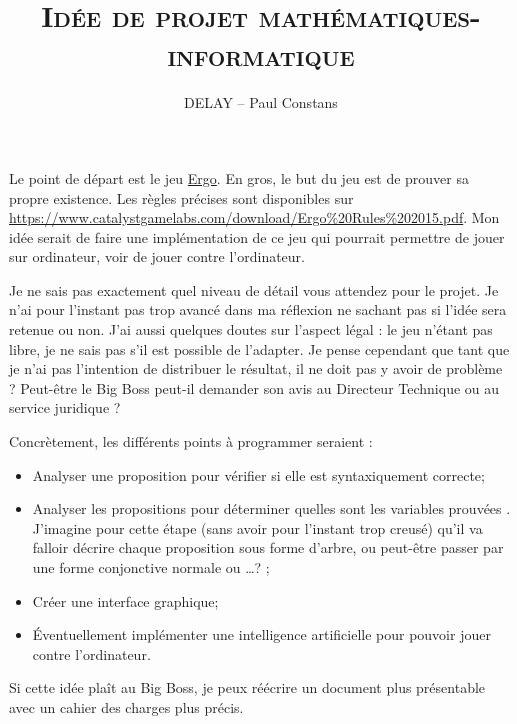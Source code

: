 \documentclass[12pt]{cours}
\title{\textbf{\textsc{Idée de projet mathématiques-informatique}}}
\author{DELAY -- Paul Constans}
\begin{document}
Le point de départ est le jeu \href{https://www.catalystgamelabs.com/ergo/}{Ergo}. En gros, le but du jeu est de prouver sa propre existence. Les règles précises sont disponibles sur \url{https://www.catalystgamelabs.com/download/Ergo%20Rules%202015.pdf}. Mon idée serait de faire une implémentation de ce jeu qui pourrait permettre de jouer sur ordinateur, voir de jouer contre l'ordinateur.

Je ne sais pas exactement quel niveau de détail vous attendez pour le projet. Je n'ai pour l'instant pas trop avancé dans ma réflexion ne sachant pas si l'idée sera retenue ou non. J'ai aussi quelques doutes sur l'aspect légal : le jeu n'étant pas libre, je ne sais pas s'il est possible de l'adapter. Je pense cependant que tant que je n'ai pas l'intention de distribuer le résultat, il ne doit pas y avoir de problème ? Peut-être le Big Boss peut-il demander son avis au Directeur Technique ou au service juridique ?

Concrètement, les différents points à programmer seraient :
\begin{itemize}
\item Analyser une proposition pour vérifier si elle est syntaxiquement correcte;
\item Analyser les propositions pour déterminer quelles sont les variables \og prouvées \fg. J'imagine pour cette étape (sans avoir pour l'instant trop creusé) qu'il va falloir décrire chaque proposition sous forme d'arbre, ou peut-être passer par une forme conjonctive normale ou \dots ? ;
\item Créer une interface graphique;
\item Éventuellement implémenter une \og intelligence artificielle \fg{} pour pouvoir jouer contre l'ordinateur.
\end{itemize}

\bigskip
Si cette idée plaît au Big Boss, je peux réécrire un document plus présentable avec un cahier des charges plus précis.
\end{document}
